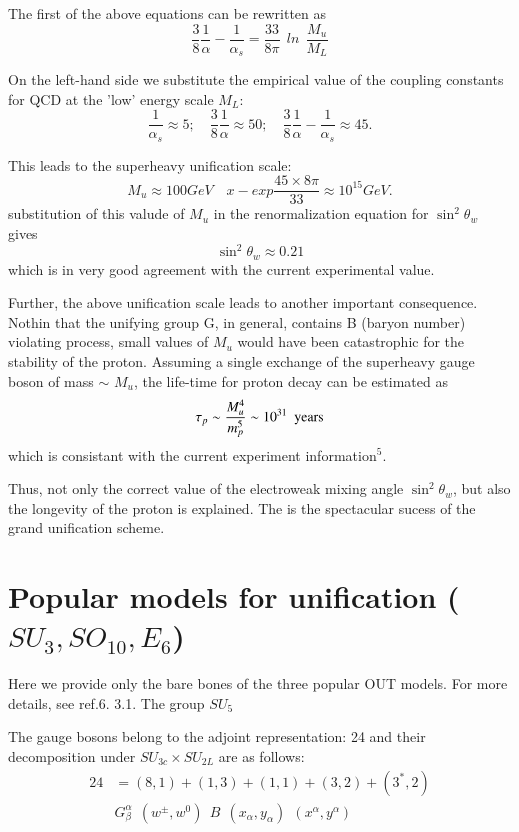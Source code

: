 The first of the above equations can be rewritten as
$$
\frac{3}{8} \frac{1}{\alpha} - \frac{1}{\alpha_{s}} = \frac{33}{8 \pi}~~ ln ~~ \frac{M_{u}}{M_{L}}
$$

On the left-hand side we substitute the empirical value of the coupling constants for QCD at the 'low' energy scale $M_{L}$:
$$
\frac{1}{\alpha_{s}} \approx 5;\quad \frac{3}{8} \frac{1}{\alpha} \approx 50;\quad \frac{3}{8} \frac{1}{\alpha} - \frac{1}{\alpha_{s}} \approx 45.
$$

This leads to the superheavy unification scale:
$$
M_{u} \approx 100 GeV\quad x-exp \frac{45 \times 8\pi}{ 33} \approx 10^{15} GeV.
$$
substitution of this valude of $M_{u}$ in the renormalization equation for $\sin^{2} \theta_{w}$ gives
$$
\sin^{2}\theta_{w} \approx 0.21
$$
which is in very good  agreement with the current experimental value.

Further, the above unification scale leads to another important consequence. Nothin that the unifying group G, in general, contains B (baryon number) violating process, small values of $M_{u}$ would have been catastrophic for the stability of the proton. Assuming a single exchange of the superheavy gauge boson of mass $\sim$ $M_{u}$, the life-time for proton decay can be estimated as 
$$
\tau_{p} \sim \frac{M_{u}^{4}}{m_{p}^{5}} \sim 10^{31}~~ {\rm years}
$$
which is consistant with the current experiment information$^{5}$.

Thus, not only the correct value of the electroweak mixing angle $\sin^{2}\theta_{w}$, but also the longevity of the proton is explained. The is the spectacular sucess of the grand unification scheme.

\section{Popular models for unification ($SU_{3}, SO_{10}, E_{6}$)}\label{sec-3}

Here we provide only the bare bones of the three popular OUT models. For more details, see ref.6. 3.1. The group $SU_{5}$

The gauge bosons belong to the adjoint representation: 24 and their decomposition under $SU_{3c} \times SU_{2L}$ are as follows:
\begin{align*}
24 & = (8,1) + (1,3) + (1,1) + (3,2) + (3^{*}, 2)\\
   & G^{\alpha}_{\beta}~~ (w^{\pm}, w^{0})~~ B~~ (x_{\alpha}, y_{\alpha})~~ (x^{\alpha}, y^{\alpha})
\end{align*}


